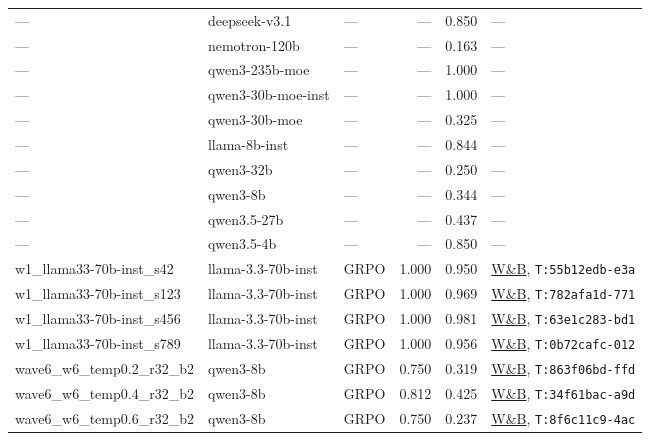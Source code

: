 \documentclass[12pt,a4paper]{report}
\theoremstyle{definition}
\begin{document}
{\begin{longtable}{p{3.5cm}p{2cm}p{1.2cm}rrp{3.5cm}}
--- & deepseek-v3.1 & --- & --- & 0.850 & --- \\
--- & nemotron-120b & --- & --- & 0.163 & --- \\
--- & qwen3-235b-moe & --- & --- & 1.000 & --- \\
--- & qwen3-30b-moe-inst & --- & --- & 1.000 & --- \\
--- & qwen3-30b-moe & --- & --- & 0.325 & --- \\
--- & llama-8b-inst & --- & --- & 0.844 & --- \\
--- & qwen3-32b & --- & --- & 0.250 & --- \\
--- & qwen3-8b & --- & --- & 0.344 & --- \\
--- & qwen3.5-27b & --- & --- & 0.437 & --- \\
--- & qwen3.5-4b & --- & --- & 0.850 & --- \\
w1\_llama33-70b-inst\_s42 & llama-3.3-70b-inst & GRPO & 1.000 & 0.950 & \href{https://wandb.ai/arvindcr4-pes-university/tinker-rl-lab-world-class/runs/3zwb7akd}{W\&B}, \texttt{T:55b12edb-e3a} \\
w1\_llama33-70b-inst\_s123 & llama-3.3-70b-inst & GRPO & 1.000 & 0.969 & \href{https://wandb.ai/arvindcr4-pes-university/tinker-rl-lab-world-class/runs/rr9b9tn0}{W\&B}, \texttt{T:782afa1d-771} \\
w1\_llama33-70b-inst\_s456 & llama-3.3-70b-inst & GRPO & 1.000 & 0.981 & \href{https://wandb.ai/arvindcr4-pes-university/tinker-rl-lab-world-class/runs/0orv0eyr}{W\&B}, \texttt{T:63e1c283-bd1} \\
w1\_llama33-70b-inst\_s789 & llama-3.3-70b-inst & GRPO & 1.000 & 0.956 & \href{https://wandb.ai/arvindcr4-pes-university/tinker-rl-lab-world-class/runs/3eryah20}{W\&B}, \texttt{T:0b72cafc-012} \\
wave6\_w6\_temp0.2\_r32\_b2 & qwen3-8b & GRPO & 0.750 & 0.319 & \href{https://wandb.ai/arvindcr4-pes-university/tinker-rl-lab-world-class/runs/863f06bd-ffd4-534b-be7f-3e10f9a0f86f:train:0}{W\&B}, \texttt{T:863f06bd-ffd} \\
wave6\_w6\_temp0.4\_r32\_b2 & qwen3-8b & GRPO & 0.812 & 0.425 & \href{https://wandb.ai/arvindcr4-pes-university/tinker-rl-lab-world-class/runs/34f61bac-a9d5-57b8-8167-d11c8ca0e454:train:0}{W\&B}, \texttt{T:34f61bac-a9d} \\
wave6\_w6\_temp0.6\_r32\_b2 & qwen3-8b & GRPO & 0.750 & 0.237 & \href{https://wandb.ai/arvindcr4-pes-university/tinker-rl-lab-world-class/runs/8f6c11c9-4ac6-5e4b-80c8-abc6ae27badc:train:0}{W\&B}, \texttt{T:8f6c11c9-4ac} \\

\end{longtable}}
\end{document}
